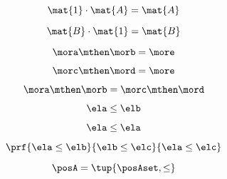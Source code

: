 \begin{forslides}
          
             \begin{equation}
                \label{eq:semicats-slides-133}
                \mat{1} \cdot \mat{A} = \mat{A}
            \end{equation}
            
            
             \begin{equation}
                \label{eq:semicats-slides-134}
                 \mat{B} \cdot \mat{1} = \mat{B}
            \end{equation}
            
             
             \begin{equation}
                \label{eq:semicats-slides-135}
                \mora \mthen \morb = \more
            \end{equation}
            
           
             \begin{equation}
                \label{eq:semicats-slides-136}
                \morc \mthen \mord = \more
            \end{equation}
            
            
             \begin{equation}
                \label{eq:semicats-slides-137}
                \mora \mthen \morb = \morc \mthen \mord
            \end{equation}
            
           
               
                   \begin{equation}
                \label{eq:semicats-slides-138}
                \ela \leq \elb
            \end{equation}
            
            
             \begin{equation}
                \label{eq:semicats-slides-139}
                \ela \leq \ela
            \end{equation}
            
            
             \begin{equation}
                \label{eq:semicats-slides-140}
                \prf{
                \ela \leq \elb
                }{
                \elb \leq \elc
                }{
                \ela \leq \elc
                }
            \end{equation}
            
         
             \begin{equation}
                \label{eq:semicats-slides-141}
                \posA = \tup{\posAset, \leq}
            \end{equation}
            

\end{forslides}
